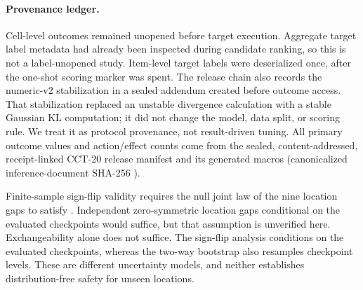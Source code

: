 \paragraph{Provenance ledger.}
Cell-level outcomes remained unopened before target execution. Aggregate target label metadata had
already been inspected during candidate ranking, so this is not a label-unopened study.
Item-level target labels were deserialized once, after the one-shot scoring marker was spent. The
release chain also records the numeric-v2 stabilization in a sealed addendum created before outcome access.
That stabilization replaced an unstable divergence calculation with a stable Gaussian KL computation; it
did not change the model, data split, or scoring rule. We treat it as protocol provenance, not
result-driven tuning. All primary outcome values and action/effect counts come from the sealed,
content-addressed, receipt-linked CCT-20 release manifest and its generated macros
(canonicalized inference-document SHA-256
\hashtext{\CCTInferenceSHA}).

\begin{table}[t]
\centering
\scriptsize
\caption{Locked CCT-20 primary contrasts. The estimand is baseline regret minus KGA regret, so
positive values mean lower regret for KGA. Intervals use a paired two-way product bootstrap that
resamples checkpoint rows and location columns independently. Two nominal 97.5\% per-comparison
intervals target a nominal 95\% Bonferroni family level; actual family coverage requires valid
marginal coverage. Reference $p$-values enumerate one-sided sign flips of the nine location means
under . Holm adjusts only these reference values; the threshold
flags reproduce the locked calculation, not a verified population guarantee.}
\label{tab:cct20-primary}
\resizebox{\textwidth}{!}{}
\end{table}

Finite-sample sign-flip validity requires the null joint law of the nine location gaps to satisfy
. Independent zero-symmetric location gaps conditional on the
evaluated checkpoints would suffice, but that assumption is unverified here. Exchangeability alone
does not suffice. The sign-flip analysis conditions on the evaluated checkpoints, whereas the
two-way bootstrap also resamples checkpoint levels. These are different uncertainty models, and
neither establishes distribution-free safety for unseen locations.

